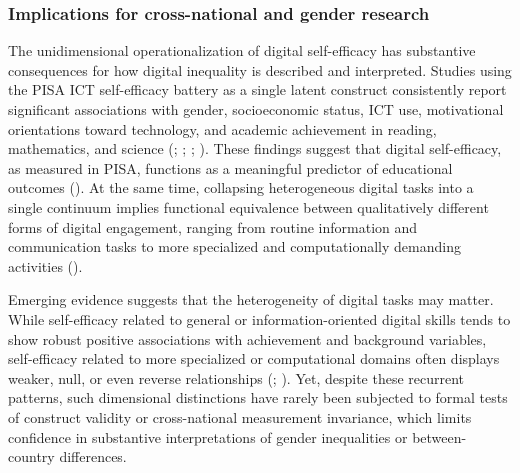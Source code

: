 \documentclass[
  letterpaper,
  DIV=11,
  numbers=noendperiod]{scrartcl}
\begin{document}
\subsubsection{Implications for cross-national and gender
research}\label{implications-for-cross-national-and-gender-research}

The unidimensional operationalization of digital self-efficacy has
substantive consequences for how digital inequality is described and
interpreted. Studies using the PISA ICT self-efficacy battery as a
single latent construct consistently report significant associations
with gender, socioeconomic status, ICT use, motivational orientations
toward technology, and academic achievement in reading, mathematics, and
science (;
;
; ). These findings
suggest that digital self-efficacy, as measured in PISA, functions as a
meaningful predictor of educational outcomes
(). At the same time,
collapsing heterogeneous digital tasks into a single continuum implies
functional equivalence between qualitatively different forms of digital
engagement, ranging from routine information and communication tasks to
more specialized and computationally demanding activities
().

Emerging evidence suggests that the heterogeneity of digital tasks may
matter. While self-efficacy related to general or information-oriented
digital skills tends to show robust positive associations with
achievement and background variables, self-efficacy related to more
specialized or computational domains often displays weaker, null, or
even reverse relationships
(;
).
Yet, despite these recurrent patterns, such dimensional distinctions
have rarely been subjected to formal tests of construct validity or
cross-national measurement invariance, which limits confidence in
substantive interpretations of gender inequalities or between-country
differences.
\end{document}
